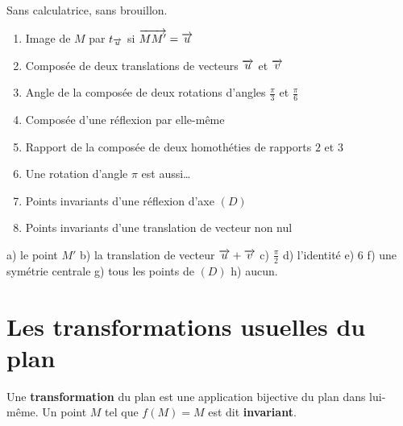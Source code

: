\begin{automatismes}
Sans calculatrice, sans brouillon.

\begin{enumerate}[label=\textbf{\alph*)}, leftmargin=*, itemsep=0.25em]
  \item Image de $M$ par $t_{\overrightarrow{u}}$ si $\overrightarrow{MM'} = \overrightarrow{u}$
  \item Composée de deux translations de vecteurs $\overrightarrow{u}$ et $\overrightarrow{v}$
  \item Angle de la composée de deux rotations d'angles
        $\frac{\pi}{3}$ et $\frac{\pi}{6}$
  \item Composée d'une réflexion par elle-même
  \item Rapport de la composée de deux homothéties de rapports $2$ et $3$
  \item Une rotation d'angle $\pi$ est aussi\dots
  \item Points invariants d'une réflexion d'axe $(D)$
  \item Points invariants d'une translation de vecteur non nul
\end{enumerate}
\end{automatismes}

\begin{corrige}[automatismes]
a) le point $M'$ \quad b) la translation de vecteur $\overrightarrow{u}+\overrightarrow{v}$ \quad
c) $\frac{\pi}{2}$ \quad d) l'identité \quad e) $6$ \quad
f) une symétrie centrale \quad g) tous les points de $(D)$ \quad
h) aucun.
\end{corrige}

\section{Les transformations usuelles du plan}

\begin{definition}[transformation]
Une \textbf{transformation} du plan est une application bijective du plan dans
lui-même. Un point $M$ tel que $f(M) = M$ est dit \textbf{invariant}.
\end{definition}

